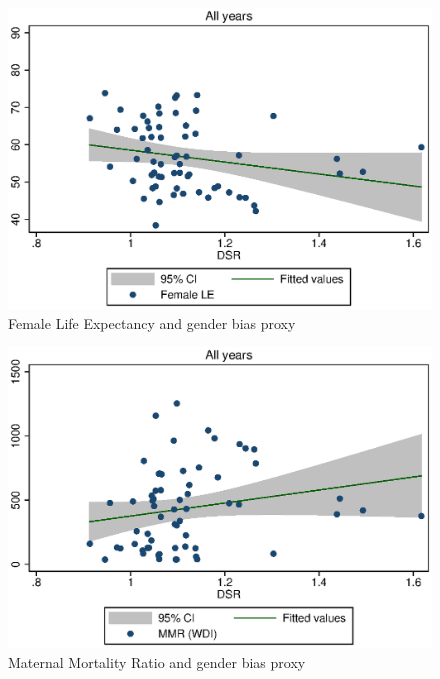 \documentclass[legno]{beamer}
\begin{document}
\begin{frame}
\begin{figure}
\caption{Female Life Expectancy and gender bias proxy}
\includegraphics[scale=0.8]{./figures/lLEdesiredall.eps}
\end{figure}
\end{frame}

\begin{frame}
\begin{figure}
\caption{Maternal Mortality Ratio and gender bias proxy}
\includegraphics[scale=0.8]{./figures/lMMRWDIdesiredall.eps}
\end{figure}
\end{frame}
\end{document}
